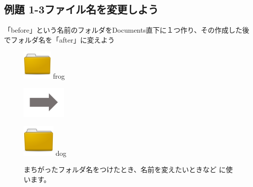 \documentclass[a4paper,12pt]{jarticle}
\begin{document}
\clearpage\subsection{例題 1-3ファイル名を変更しよう}
「before」という名前のフォルダをDocuments直下に１つ作り、その作成した後でフォルダ名を「after」に変えよう

\begin{figure}[ht]

\centering
\begin{minipage}{1.978cm}
\includegraphics[width=1.45cm,height=1.45cm]{textbook-img044.png}
frog
\end{minipage}
\includegraphics[width=2.168cm,height=1.542cm]{textbook-img052.png}
\begin{minipage}{1.978cm}
\includegraphics[width=1.588cm,height=1.588cm]{textbook-img044.png}
dog
\end{minipage}
\begin{minipage}{6.319cm}
まちがったフォルダ名をつけたとき、名前を変えたいときなど
に使います。
\end{minipage}


\end{figure}
\end{document}
